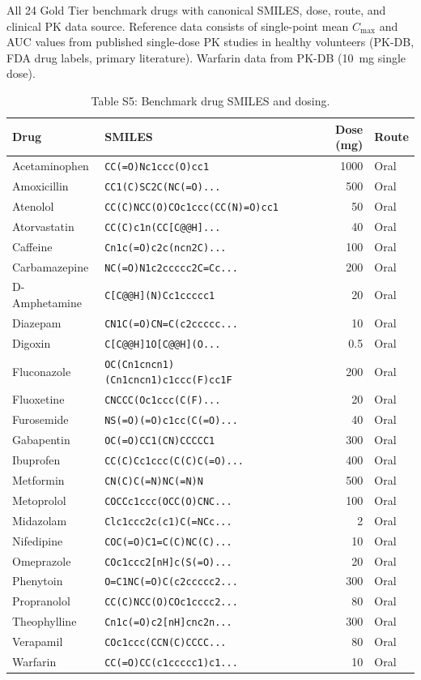 \documentclass[review,3p]{elsarticle}
\begin{document}
All 24 Gold Tier benchmark drugs with canonical SMILES, dose, route, and clinical PK data source. Reference data consists of single-point mean $C_{\max}$ and AUC values from published single-dose PK studies in healthy volunteers (PK-DB, FDA drug labels, primary literature). Warfarin data from PK-DB (10~mg single dose).

\begin{table}[H]
\centering
\caption*{Table S5: Benchmark drug SMILES and dosing.}
\small
\begin{tabular}{llrl}
\toprule
Drug & SMILES & Dose (mg) & Route \\
\midrule
Acetaminophen & \texttt{CC(=O)Nc1ccc(O)cc1} & 1000 & Oral \\
Amoxicillin & \texttt{CC1(C)SC2C(NC(=O)...} & 500 & Oral \\
Atenolol & \texttt{CC(C)NCC(O)COc1ccc(CC(N)=O)cc1} & 50 & Oral \\
Atorvastatin & \texttt{CC(C)c1n(CC[C@@H]...} & 40 & Oral \\
Caffeine & \texttt{Cn1c(=O)c2c(ncn2C)...} & 100 & Oral \\
Carbamazepine & \texttt{NC(=O)N1c2ccccc2C=Cc...} & 200 & Oral \\
D-Amphetamine & \texttt{C[C@@H](N)Cc1ccccc1} & 20 & Oral \\
Diazepam & \texttt{CN1C(=O)CN=C(c2ccccc...} & 10 & Oral \\
Digoxin & \texttt{C[C@@H]1O[C@@H](O...} & 0.5 & Oral \\
Fluconazole & \texttt{OC(Cn1cncn1)(Cn1cncn1)c1ccc(F)cc1F} & 200 & Oral \\
Fluoxetine & \texttt{CNCCC(Oc1ccc(C(F)...} & 20 & Oral \\
Furosemide & \texttt{NS(=O)(=O)c1cc(C(=O)...} & 40 & Oral \\
Gabapentin & \texttt{OC(=O)CC1(CN)CCCCC1} & 300 & Oral \\
Ibuprofen & \texttt{CC(C)Cc1ccc(C(C)C(=O)...} & 400 & Oral \\
Metformin & \texttt{CN(C)C(=N)NC(=N)N} & 500 & Oral \\
Metoprolol & \texttt{COCCc1ccc(OCC(O)CNC...} & 100 & Oral \\
Midazolam & \texttt{Clc1ccc2c(c1)C(=NCc...} & 2 & Oral \\
Nifedipine & \texttt{COC(=O)C1=C(C)NC(C)...} & 10 & Oral \\
Omeprazole & \texttt{COc1ccc2[nH]c(S(=O)...} & 20 & Oral \\
Phenytoin & \texttt{O=C1NC(=O)C(c2ccccc2...} & 300 & Oral \\
Propranolol & \texttt{CC(C)NCC(O)COc1cccc2...} & 80 & Oral \\
Theophylline & \texttt{Cn1c(=O)c2[nH]cnc2n...} & 300 & Oral \\
Verapamil & \texttt{COc1ccc(CCN(C)CCCC...} & 80 & Oral \\
Warfarin & \texttt{CC(=O)CC(c1ccccc1)c1...} & 10 & Oral \\
\bottomrule
\end{tabular}
\end{table}
\end{document}
